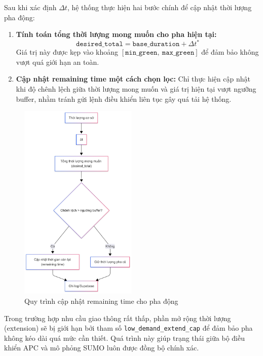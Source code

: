 Sau khi xác định \(\Delta t\), hệ thống thực hiện hai bước chính để cập nhật thời lượng pha động:
\begin{enumerate}
    \item \textbf{Tính toán tổng thời lượng mong muốn cho pha hiện tại:} 
    \[
    \texttt{desired\_total} = \texttt{base\_duration} + \Delta t^*
    \]
    Giá trị này được kẹp vào khoảng \([\texttt{min\_green},\ \texttt{max\_green}]\) để đảm bảo không vượt quá giới hạn an toàn.
    
    \item \textbf{Cập nhật remaining time một cách chọn lọc:} 
    Chỉ thực hiện cập nhật khi độ chênh lệch giữa thời lượng mong muốn và giá trị hiện tại vượt ngưỡng buffer, nhằm tránh gửi lệnh điều khiển liên tục gây quá tải hệ thống.
\end{enumerate}

\begin{figure}[H]
    \centering
    \includegraphics[width=0.5\textwidth, trim=0cm 2cm 0cm 0cm, clip]{Untitled diagram _ Mermaid Chart-2025-08-26-080816.png}
    \caption{Quy trình cập nhật remaining time cho pha động}
    \label{fig:extension_flow}
\end{figure}

Trong trường hợp nhu cầu giao thông rất thấp, phần mở rộng thời lượng (extension) sẽ bị giới hạn bởi tham số \texttt{low\_demand\_extend\_cap} để đảm bảo pha không kéo dài quá mức cần thiết. Quá trình này giúp trạng thái giữa bộ điều khiển APC và mô phỏng SUMO luôn được đồng bộ chính xác.
